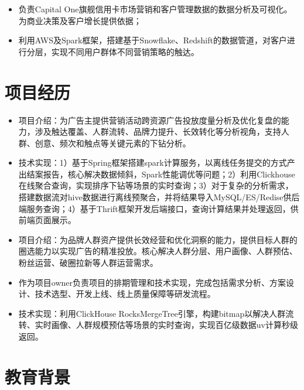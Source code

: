 \documentclass{resume}
\begin{document}
\begin{itemize}
  \item 负责Capital One旗舰信用卡市场营销和客户管理数据的数据分析及可视化。为商业决策及客户增长提供依据；
  \item 利用AWS及Spark框架，搭建基于Snowflake、Redshift的数据管道，对客户进行分层，实现不同用户群体不同营销策略的触达。
\end{itemize}

\section{项目经历}
\begin{itemize}
  \item 项目介绍：为广告主提供营销活动跨资源广告投放度量分析及优化复盘的能力，涉及触达覆盖、人群流转、品牌力提升、长效转化等分析视角，支持人群、创意、频次和触点等关键元素的下钻分析。
  \item 技术实现：1）基于Spring框架搭建spark计算服务，以离线任务提交的方式产出结案报告，核心解决数据倾斜，Spark性能调优等问题；2）利用Clickhouse在线聚合查询，实现排序下钻等场景的实时查询；3）对于复杂的分析需求，搭建数据流对hive数据进行离线预聚合，并将结果导入MySQL/ES/Redise供后端服务查询；4）基于Thrift框架开发后端接口，查询计算结果并处理返回，供前端页面展示。
\end{itemize}

\begin{itemize}
  \item 项目介绍：为品牌人群资产提供长效经营和优化洞察的能力，提供目标人群的圈选能力以实现广告的精准投放。核心解决人群分层、用户画像、人群预估、粉丝运营、破圈拉新等人群运营需求。
  \item 作为项目owner负责项目的排期管理和技术实现，完成包括需求分析、方案设计、技术选型、开发上线、线上质量保障等研发流程。
  \item 技术实现：利用ClickHouse RocksMergeTree引擎，构建bitmap以解决人群流转、实时画像、人群规模预估等场景的实时查询，实现百亿级数据uv计算秒级返回。
\end{itemize}

\section{教育背景}
\end{document}
